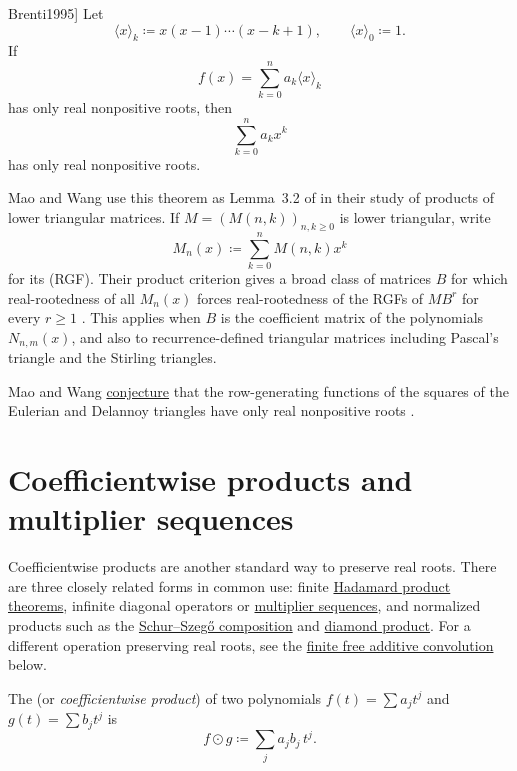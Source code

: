 \begin{theorem}[Brenti, \cite[Thm.~2.4.2]{Brenti1995}]
\label{thm:brentiFallingFactorialBasis}
Let
\[
  \langle x\rangle_k\coloneqq x(x-1)\dotsm(x-k+1),
  \qquad \langle x\rangle_0\coloneqq 1.
\]
If
\[
  f(x)=\sum_{k=0}^n a_k\langle x\rangle_k
\]
has only real nonpositive roots, then
\[
  \sum_{k=0}^n a_kx^k
\]
has only real nonpositive roots.
\end{theorem}

Mao and Wang use this theorem as Lemma~3.2 of \cite{MaoWang2026x} in
their study of products of lower triangular matrices.  If
$M=(M(n,k))_{n,k\geq 0}$ is lower triangular, write
\[
  M_n(x)\coloneqq \sum_{k=0}^n M(n,k)x^k
\]
for its \label{rowGeneratingFunction} (RGF).
Their product criterion gives a broad class of matrices $B$ for which
real-rootedness of all $M_n(x)$ forces real-rootedness of the RGFs of
$MB^r$ for every $r\geq 1$ \cite[Thm.~1.3]{MaoWang2026x}.  This applies
when $B$ is the coefficient matrix of the polynomials $N_{n,m}(x)$, and
also to recurrence-defined triangular matrices including Pascal's
triangle and the Stirling triangles.

Mao and Wang \hyperref[conj:eulerianDelannoySquares]{conjecture} that the
row-generating functions of the squares of the Eulerian and Delannoy
triangles have only real nonpositive roots \cite[Conj.~4.1]{MaoWang2026x}.



\section[hadamardProduct]{Coefficientwise products and multiplier sequences}

Coefficientwise products are another standard way to preserve real roots.
There are three closely related forms in common use: finite
\hyperref[hadamardProductTheorems]{Hadamard product theorems}, infinite
diagonal operators or \hyperref[multiplierSequences]{multiplier sequences},
and normalized products such as the
\hyperref[schurSzegoComposition]{Schur--Szeg\H{o} composition} and
\hyperref[diamondProduct]{diamond product}.
For a different operation preserving real roots, see the
\hyperref[finiteFreeAdditiveConvolution]{finite free additive convolution} below.

The \label{hadamardProductDefinition}
(or \emph{coefficientwise product})
of two polynomials $f(t)=\sum a_j t^j$ and $g(t)=\sum b_j t^j$ is
\[
  f \odot g \coloneqq \sum_j a_j b_j \, t^j.
\]

